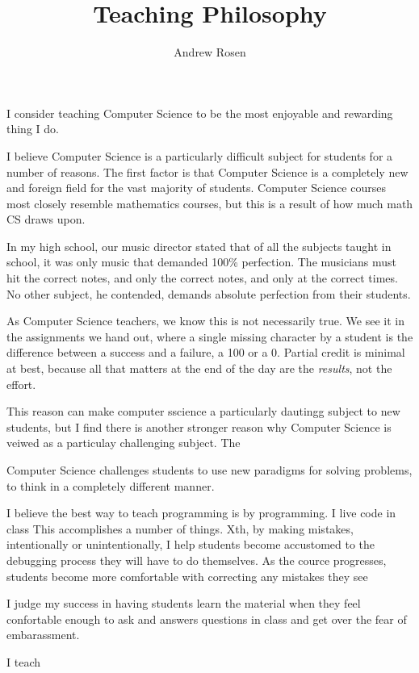 \documentclass[10pt, a4paper]{article}
\author{Andrew Rosen}
\title{Teaching Philosophy}
\date{}
\begin{document}
\maketitle
	
I consider teaching Computer Science to be the most enjoyable and rewarding thing I do.



I believe Computer Science is a particularly difficult subject for students for a number of reasons.
The first factor is that Computer Science is a completely new and foreign field for the vast majority of students.
Computer Science courses most closely resemble mathematics courses, but this is a result of how much math CS draws upon.

In my high school, our music director stated that of all the subjects taught in school, it was only music that demanded 100\% perfection.
The musicians must hit the correct notes, and only the correct notes, and only at the correct times.
No other subject, he contended, demands absolute perfection from their students.

As Computer Science teachers, we know this is not necessarily true. 
We see it in the assignments we hand out, where a single missing character by a student is the difference between a success and a failure, a 100 or a 0.
Partial credit is minimal at best, because all that matters at the end of the day are the \textit{results}, not the effort.

This reason can make computer sscience a particularly dautingg subject to new students, but I find there is another stronger reason why Computer Science is veiwed as  a particulay  challenging subject.  
The 

Computer Science challenges students to use new paradigms for solving problems, to think in a completely different manner.



I believe the best way to teach programming is by programming.
I live code in class
This accomplishes a number of things.
Xth, by making mistakes, intentionally or unintentionally, I help students become accustomed to the debugging process they will have to do themselves.
As the cource progresses, students become more comfortable with correcting any mistakes they see



I judge my success in having students learn the material when they feel confortable enough to ask and  answers questions in class and get over the fear of embarassment.

I teach 
\end{document}
